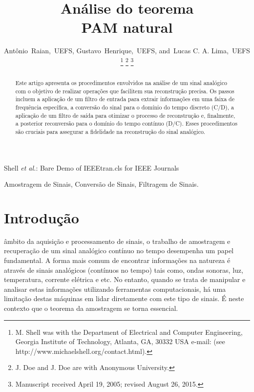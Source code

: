 \documentclass[journal]{IEEEtran}
\begin{document}
\title{Análise do teorema\\ PAM natural}

\author{Antônio~Raian,~UEFS,
        Gustavo~Henrique,~UEFS,
        and~Lucas C. A. Lima,~UEFS%
\thanks{M. Shell was with the Department
of Electrical and Computer Engineering, Georgia Institute of Technology, Atlanta,
GA, 30332 USA e-mail: (see http://www.michaelshell.org/contact.html).}%
\thanks{J. Doe and J. Doe are with Anonymous University.}%
\thanks{Manuscript received April 19, 2005; revised August 26, 2015.}}


%
{Shell \MakeLowercase{\textit{et al.}}: Bare Demo of IEEEtran.cls for IEEE Journals}

\maketitle

\begin{abstract}
Este artigo apresenta os procedimentos envolvidos na análise de um sinal analógico com o objetivo de realizar operações que facilitem sua reconstrução precisa. Os passos incluem a aplicação de um filtro de entrada para extrair informações em uma faixa de frequência específica, a conversão do sinal para o domínio do tempo discreto (C/D), a aplicação de um filtro de saída para otimizar o processo de reconstrução e, finalmente, a posterior reconversão para o domínio do tempo contínuo (D/C). Esses procedimentos são cruciais para assegurar a fidelidade na reconstrução do sinal analógico.
\end{abstract}

\begin{IEEEkeywords}
Amostragem de Sinais, Conversão de Sinais, Filtragem de Sinais.
\end{IEEEkeywords}


\IEEEpeerreviewmaketitle



\section{Introdução}

 âmbito da aquisição e processamento de sinais, o trabalho de amostragem e recuperação de um sinal analógico contínuo no tempo desempenha um papel fundamental. A forma mais comum de encontrar informações na natureza é através de sinais analógicos (contínuos no tempo) tais como, ondas sonoras, luz, temperatura, corrente elétrica e etc. No entanto, quando se trata de manipular e analisar estas informações utilizando ferramentas computacionais, há uma limitação destas máquinas em lidar diretamente com este tipo de sinais. É neste contexto que o teorema da amostragem se torna essencial. 
\end{document}

